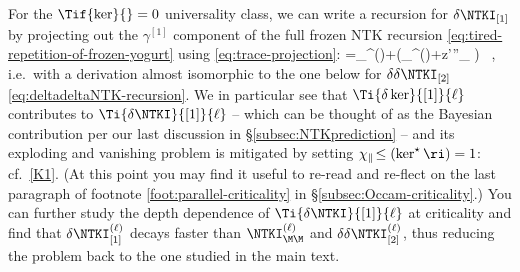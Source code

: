 {For the $\Tif{\ker}{}=0$ universality class, %
we can write a recursion for $\delta\NTKI_{[1]}$ by projecting out the $\gamma^{[1]}$ component of the full frozen NTK recursion \eqref{eq:tired-repetition-of-frozen-yogurt} using \eqref{eq:trace-projection}:
\be\label{eq:deltaNTK-recursion}
=\chi_{\perp}^{(\ell)}\Ti{\delta\NTKI}{[1]}{\ell}+\le(\chi_{\parallel}^{(\ell)}+\bra z\sigma'\sigma''\ket_{\KML} \Ti{\NTKI}{\M\M}{\ell}\ri) \Ti{\delta\ker}{[1]}{\ell}\, ,
\ee
i.e.~with a derivation almost isomorphic to the one below for $\delta\delta\NTKI_{[2]}$ \eqref{eq:deltadeltaNTK-recursion}. We in particular see that $\Ti{\delta\ker}{[1]}{\ell}$ contributes to $\Ti{\delta\NTKI}{[1]}{\ell}$ --
which can be thought of as the Bayesian contribution per our last discussion in \S\ref{subsec:NTKprediction} --
and its exploding and vanishing problem is mitigated by setting  $\chi_\parallel\!\le(\ker^\star\ri)=1$: cf.~\eqref{K1}. (At this point you may find it useful to re-read and re-flect on the last paragraph of footnote \ref{foot:parallel-criticality} in \S\ref{subsec:Occam-criticality}.) You can further study the depth dependence of $\Ti{\delta\NTKI}{[1]}{\ell}$ at criticality and find that $\delta\NTKI_{[1]}^{(\ell)}$ decays faster than $\NTKI_{\M\M}^{(\ell)}$ and $\delta\delta\NTKI_{[2]}^{(\ell)}$, thus reducing the problem back to the one studied in the main text.}





